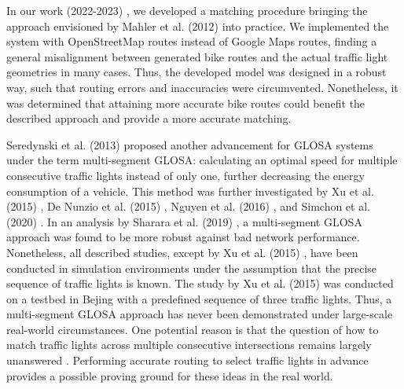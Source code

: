 In our work (2022-2023) \cite{matthes2022matching, matthes2023geo}, we developed a matching procedure bringing the approach envisioned by Mahler et al. (2012) \cite{mahler_reducing_2012} into practice. We implemented the system with OpenStreetMap routes instead of Google Maps routes, finding a general misalignment between generated bike routes and the actual traffic light geometries in many cases. Thus, the developed model was designed in a robust way, such that routing errors and inaccuracies were circumvented. Nonetheless, it was determined that attaining more accurate bike routes could benefit the described approach and provide a more accurate matching.

Seredynski et al. (2013) \cite{seredynski_comparison_2013, seredynski_multi-segment_2013} proposed another advancement for GLOSA systems under the term multi-segment GLOSA: calculating an optimal speed for multiple consecutive traffic lights instead of only one, further decreasing the energy consumption of a vehicle. This method was further investigated by Xu et al. (2015) \cite{xu_bb_2015}, De Nunzio et al. (2015) \cite{de_nunzio_eco-driving_2015}, Nguyen et al. (2016) \cite{nguyen_efficient_2016}, and Simchon et al. (2020) \cite{simchon_real-time_2020}. In an analysis by Sharara et al. (2019) \cite{sharara_impact_2019}, a multi-segment GLOSA approach was found to be more robust against bad network performance. Nonetheless, all described studies, except by Xu et al. (2015) \cite{xu_bb_2015}, have been conducted in simulation environments under the assumption that the precise sequence of traffic lights is known. The study by Xu et al. (2015) \cite{xu_bb_2015} was conducted on a testbed in Bejing with a predefined sequence of three traffic lights. Thus, a multi-segment GLOSA approach has never been demonstrated under large-scale real-world circumstances. One potential reason is that the question of how to match traffic lights across multiple consecutive intersections remains largely unanswered \cite{mellegard_day_2020}. Performing accurate routing to select traffic lights in advance provides a possible proving ground for these ideas in the real world.

